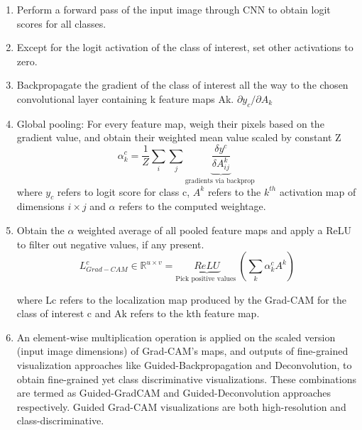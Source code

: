 \documentclass[../report.tex]{subfiles}
\begin{document}
\begin{enumerate}
	\item Perform a forward pass of the input image through CNN to obtain logit scores for all classes.
	\item  Except for the logit activation of the class of interest, set other activations to zero.
	\item Backpropagate the gradient of the class of interest all the way to the chosen convolutional layer containing k feature maps Ak. $\partial y_c /\partial A_k$
	\item Global pooling: For every feature map, weigh their pixels based on the gradient value, and obtain their weighted mean value scaled by constant Z
	 \begin{equation*}
	 	\alpha_k^c={\frac{1}{Z} \sum_i \sum_j} \underbrace{\frac{\delta y^c}{\delta A_{i j}^k}}_{\text {gradients via backprop }}
	 \end{equation*}
	where $y_c$ refers to logit score for class c, $A^k$ refers to the $k^{th}$ activation map of dimensions $i \times j$ and $\alpha$ refers to the computed weightage.
	\item Obtain the $\alpha$ weighted average of all pooled feature maps and apply a ReLU to filter out negative values, if any present.
	\begin{equation*}
		L_{G r a d-C A M}^c \in \mathbb{R}^{u \times v}=\underbrace{R e L U}_{\text {Pick positive values }}\left(\sum_k \alpha_k^c A^k\right)
	\end{equation*}
	
	where Lc refers to the localization map produced by the Grad-CAM for the class of interest c and Ak refers to the kth feature map.
	\item An element-wise multiplication operation is applied on the scaled version (input image dimensions) of Grad-CAM’s maps, and outputs of fine-grained visualization approaches like Guided-Backpropagation and Deconvolution, to obtain fine-grained yet class discriminative visualizations. These combinations are termed as Guided-GradCAM and Guided-Deconvolution approaches respectively. Guided Grad-CAM visualizations are both high-resolution and class-discriminative.
\end{enumerate}
	
\end{document}
